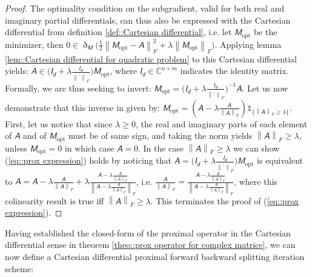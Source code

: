 \documentclass{article}
\newcommand{\mat}[1]{\bm{\mathsfit{#1}}}
\newcommand{\Id}[1]{\bm{\mathsfit{I}}^{#1}_{\bm{\mathsfit{d}} }}
\begin{document}
\begin{proof} 
    The optimality condition on the subgradient, valid for both real and imaginary partial differentials, can thus also be expressed with the Cartesian differential from definition \ref{def::Cartesian differential}, i.e. let $\mat{M}_{\mathrm{opt}}$ be the minimizer, then $\mat{0} \in \eth_{\mat{M}} \Bigg( \frac{1}{2} \left\| \mat{M}_{\mathrm{opt}} - \mat{A} \right\|^2_F + \lambda \left\| \mat{M}_{\mathrm{opt}}\right\|_F \Bigg)$. Applying lemma \ref{lem::Cartesian differential for quadratic problem} to this Cartesian differential yields: $\mat{A} \in \Big( \Id{} + \lambda \frac{\Id{}}{\left\| \cdot \right\|_F} \Big)\mat{M}_{\mathrm{opt}}$, where $\Id{} \in \mathbb{C}^{n\times m}$ indicates the identity matrix. Formally, we are thus seeking to invert: $\mat{M}_{\mathrm{opt}} = \Big( \Id{} + \lambda \frac{\Id{}}{\left\| \cdot \right\|_F} \Big)^{-1}\mat{A}$.
    Let us now demonstrate that this inverse in given by:
    $\mat{M}_{\mathrm{opt}} = \left( \mat{A} - \lambda \frac{\mat{A}}{\left\| \mat{A} \right\|_F} \right)\mathds{1}_{\Big\{ \left\| \mat{A} \right\|_F \geq \lambda \Big\}}$. 
    First, let us notice that since $\lambda \geq 0$, the real and imaginary parts of each element of $\mat{A}$ and of $\mat{M}_{\mathrm{opt}}$ must be of same sign, and taking the norm yields $ \left\| \mat{A} \right\|_F \geq \lambda$, unless $\mat{M}_{\mathrm{opt}} = \mat{0}$ in which case $\mat{A}= \mat{0}$. In the case $ \left\| \mat{A} \right\|_F \geq \lambda$ we can show (\ref{eq::prox expression}) holds by noticing that $\mat{A} = \Big( \Id{} + \lambda \frac{\Id{}}{\left\| \cdot \right\|_F} \Big)\mat{M}_{\mathrm{opt}}$ 
    is equivalent to $\mat{A} =  \mat{A} - \lambda \frac{\mat{A}}{\left\| \mat{A} \right\|_F} + \lambda \frac{\mat{A} - \lambda \frac{\mat{A}}{\left\| \mat{A} \right\|_F} }{\left\| \mat{A} - \lambda \frac{\mat{A}}{\left\| \mat{A} \right\|_F} \right\|_F}$, 
    i.e. $\frac{\mat{A}}{\left\| \mat{A} \right\|_F} =   \frac{\mat{A} - \lambda \frac{\mat{A}}{\left\| \mat{A} \right\|_F}}{\left\| \mat{A} - \lambda \frac{\mat{A}}{\left\| \mat{A} \right\|_F} \right\|_F}$, where this colinearity result is true iff $ \left\| \mat{A} \right\|_F \geq \lambda$. This terminates the proof of (\ref{eq::prox expression}).
\end{proof}


Having established the closed-form of the proximal operator in the Cartesian differential sense in theorem \ref{theo::prox operator for complex matrice}, we can now define a Cartesian differential proximal forward backward splitting iteration scheme:
\end{document}
